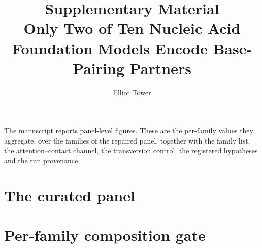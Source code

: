 \documentclass[11pt]{article}
\title{Supplementary Material\\Only Two of Ten Nucleic Acid
Foundation Models Encode Base-Pairing Partners}
\author{Elliot Tower}
\date{}
\begin{document}
\maketitle

The manuscript reports panel-level figures. These are the per-family values
they aggregate, over the \panelN{} families of the repaired panel, together
with the family list, the attention--contact channel, the transversion control,
the registered hypotheses and the run provenance.

\section*{The curated panel}



\section*{Per-family composition gate}
\end{document}
